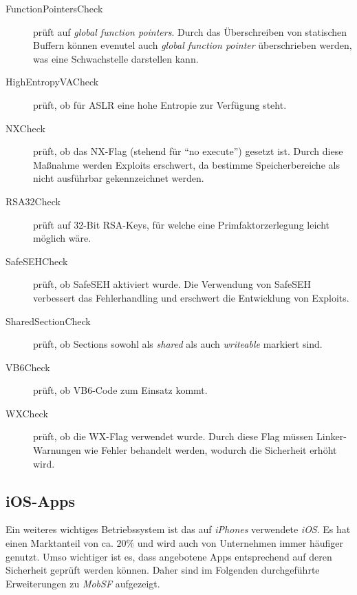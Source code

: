 \begin{description}
	\item[FunctionPointersCheck] prüft auf \textit{global function pointers}. Durch das Überschreiben von statischen Buffern können evenutel auch \textit{global function pointer} überschrieben werden, was eine Schwachstelle darstellen kann.

	\item[HighEntropyVACheck] prüft, ob für ASLR eine hohe Entropie zur Verfügung steht.
	
	\item[NXCheck] prüft, ob das NX-Flag (stehend für "`no execute"') gesetzt ist. Durch diese Maßnahme werden Exploits erschwert, da bestimme Speicherbereiche als nicht ausführbar gekennzeichnet werden.
	
	\item[RSA32Check] prüft auf 32-Bit RSA-Keys, für welche eine Primfaktorzerlegung leicht möglich wäre.
	
	\item[SafeSEHCheck] prüft, ob SafeSEH aktiviert wurde. Die Verwendung von SafeSEH verbessert das Fehlerhandling und erschwert die Entwicklung von Exploits.
	
	\item[SharedSectionCheck] prüft, ob Sections sowohl als \textit{shared} als auch \textit{writeable} markiert sind.
	
	\item[VB6Check] prüft, ob VB6-Code zum Einsatz kommt.
	
	\item[WXCheck] prüft, ob die WX-Flag verwendet wurde. Durch diese Flag müssen Linker-Warnungen wie Fehler behandelt werden, wodurch die Sicherheit erhöht wird.
\end{description}

\newpage
\subsection{iOS-Apps}
Ein weiteres wichtiges Betriebssystem ist das auf \textit{iPhones} verwendete \textit{iOS}.  Es hat einen Marktanteil von ca. $20\%$\cite{KatarWorldpanelMobBetrSys} und wird auch von Unternehmen immer häufiger genutzt. Umso wichtiger ist es, dass angebotene Apps entsprechend auf deren Sicherheit geprüft werden können. Daher sind im Folgenden durchgeführte Erweiterungen zu \textit{MobSF} aufgezeigt.


